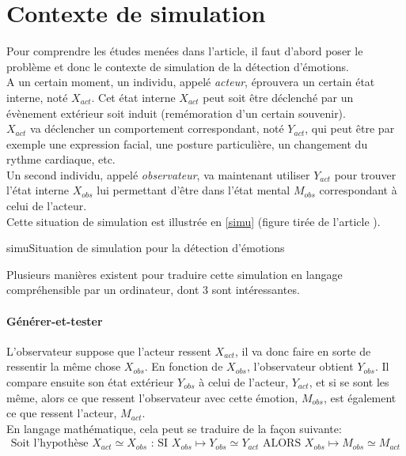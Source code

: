 \documentclass[poster]{polytech/polytech}
\begin{document}
\section{Contexte de simulation}
Pour comprendre les études menées dans l'article, il faut d'abord poser le problème et donc le contexte de simulation de la détection d'émotions.\\
A un certain moment, un individu, appelé \textit{acteur}, éprouvera un certain état interne, noté $X_{act}$. Cet état interne $X_{act}$ peut soit être déclenché par un évènement extérieur soit induit (remémoration d'un certain souvenir).\\
$X_{act}$ va déclencher un comportement correspondant, noté $Y_{act}$, qui peut être par exemple une expression facial, une posture particulière, un changement du rythme cardiaque, etc.\\
Un second individu, appelé \textit{observateur}, va maintenant utiliser $Y_{act}$ pour trouver l'état interne $X_{obs}$ lui permettant d'être dans l'état mental $M_{obs}$ correspondant à celui de l'acteur.\\
Cette situation de simulation est illustrée en \autoref{simu} (figure tirée de l'article \cite{italiens}).

\begin{Figure}{simu}{Situation de simulation pour la détection d'émotions}
\end{Figure}

Plusieurs manières existent pour traduire cette simulation en langage compréhensible par un ordinateur, dont 3 sont intéressantes.

\paragraph{Générer-et-tester}
L'observateur suppose que l'acteur ressent $X_{act}$, il va donc faire en sorte de ressentir la même chose $X_{obs}$. En fonction de $X_{obs}$, l'observateur obtient $Y_{obs}$. Il compare ensuite son état extérieur $Y_{obs}$ à celui de l'acteur, $Y_{act}$, et si se sont les même, alors ce que ressent l'observateur avec cette émotion, $M_{obs}$, est également ce que ressent l'acteur, $M_{act}$.\\
En langage mathématique, cela peut se traduire de la façon suivante:
\begin{align*}
\text{Soit l'hypothèse }X_{act}\simeq X_{obs}\text{ : SI } X_{obs}\mapsto Y_{obs}\simeq Y_{act} \text{ ALORS } X_{obs}\mapsto M_{obs}\simeq M_{act}
\end{align*}
\end{document}
